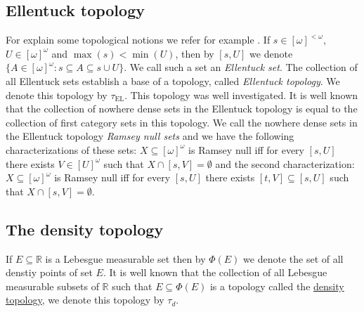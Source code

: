 \documentclass[12pt]{amsart}
\theoremstyle{plain}
\theoremstyle{definition}
\theoremstyle{remark}
\newcommand{\ca}{2^{\omega}}
\newcommand{\finsub}{[\omega]^{<\omega}}
\newcommand{\infsub}{[\omega]^{\omega}}
\newcommand{\real}{\mathbb{R}}
\newcommand{\seq}{\subseteq}
\newcommand{\tauEllentuck}{\tau_{\mathrm{EL}}}
\begin{document}
\subsection{Ellentuck topology}
For explain some topological notions we refer for example \cite{En}.
If $s \in \finsub$, $U \in \infsub$ and $\max (s) < \min(U)$,
then by $[s, U]$ we denote $\{ A \in \infsub: s \seq A \seq s \cup U\}$.
We call such a set an {\it Ellentuck set}. The collection of all
Ellentuck sets establish a base of a topology, called 
{\it Ellentuck topology}. We denote this topology 
by $\tauEllentuck$. This topology was well investigated.
It is well known that the collection of nowhere dense sets in the Ellentuck 
topology is equal to the  collection of first category sets in this topology.
We call the nowhere dense sets in the Ellentuck topology 
{\it Ramsey null sets} and we have the following characterizations of
these sets: $X \subseteq \infsub$ is Ramsey null iff for every $[s, U]$ there exists $V \in [U]^\omega$
such that $X \cap [s, V] = \emptyset$ and the second characterization:
$X \subseteq \infsub$ is Ramsey null iff for every $[s, U]$ there exists $[t, V] \subseteq [s, U]$
such that $X \cap [s, V] = \emptyset$.
\subsection{The density topology}
If $E \subseteq \real$ is a Lebesgue measurable set then by $\Phi(E)$ we denote the set of all denstiy
points of set $E$. It is well known that the collection of all Lebesgue measurable subsets of $\real$
such that $E \subseteq \Phi(E)$ is a topology called the \underline{density topology}, we denote
this topology by $\tau_d$.
\end{document}
